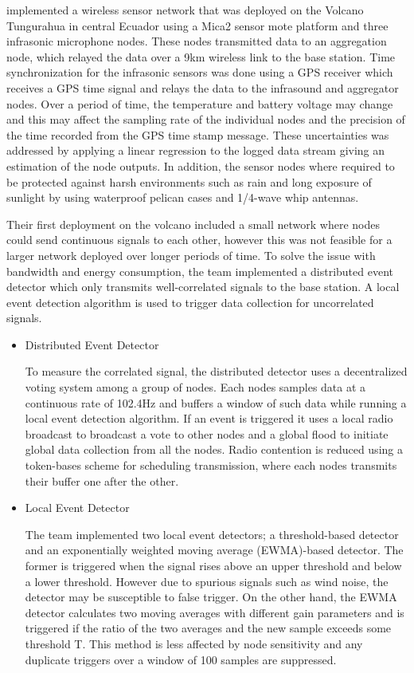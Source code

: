 \citeauthor{Werner-Allen:2006:FYV:1298455.1298491} implemented a wireless sensor network that was deployed on the Volcano Tungurahua in central Ecuador using a Mica2 sensor mote platform and three infrasonic microphone nodes. These nodes transmitted data to an aggregation node, which relayed the data over a 9km wireless link to the base station. Time synchronization for the infrasonic sensors was done using a GPS receiver which receives a GPS time signal and relays the data 
to the infrasound and aggregator nodes. Over a period of time, the temperature and battery voltage may change and this may affect the sampling rate of the individual nodes and the precision of the time recorded from the GPS time stamp message. These uncertainties was addressed by applying a linear regression to the logged data stream giving an estimation of the node outputs. In addition, the sensor nodes where required to be protected against harsh environments such as rain and long exposure of sunlight by using waterproof pelican cases and 1/4-wave whip antennas.

Their first deployment on the volcano included a small network where nodes could send continuous signals to each other, however this was not feasible for a larger network deployed over longer periods of time. To solve the issue with bandwidth and energy consumption, the team implemented a distributed event detector which only transmits well-correlated signals to the base station. A local event detection algorithm is used to trigger data collection for uncorrelated signals.

\begin{itemize}
\item Distributed Event Detector

To measure the correlated signal, the distributed detector uses a decentralized voting system among a group of nodes. Each nodes samples data at a continuous rate of 102.4Hz and buffers a window of such data while running a local event detection algorithm. If an event is triggered it uses a local radio broadcast to broadcast a vote to other nodes and a global flood to initiate global data collection from all the nodes. Radio contention is reduced using a token-bases scheme for scheduling transmission, where each nodes transmits their buffer one after the other. 

\item Local Event Detector

The team implemented two local event detectors; a threshold-based detector and an exponentially weighted moving average (EWMA)-based detector. The former is triggered when the signal rises above an upper threshold and below a lower threshold. However due to spurious signals such as wind noise, the detector may be susceptible to false trigger. On the other hand, the EWMA detector calculates two moving averages with different gain parameters and is triggered if the ratio of the two averages and the new sample exceeds some threshold T. This method is less affected by node sensitivity and any duplicate triggers over a window of 100 samples are suppressed.
\end{itemize}

